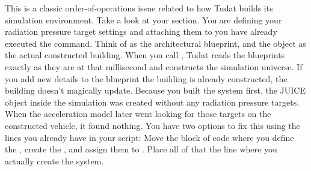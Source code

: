 {}This is a classic order-of-operations issue related to how Tudat builds its simulation environment.\markdownRendererInterblockSeparator
{}\markdownRendererSectionBegin
{}\markdownRendererInterblockSeparator
{}Take a look at your  section. You are defining your radiation pressure target settings and attaching them to   you have already executed the  command.\markdownRendererInterblockSeparator
{}
\markdownRendererSectionEnd \markdownRendererSectionBegin
{}\markdownRendererInterblockSeparator
{}Think of  as the architectural blueprint, and the  object as the actual constructed building.\markdownRendererInterblockSeparator
{}When you call , Tudat reads the blueprints exactly as they are at that millisecond and constructs the simulation universe. If you add new details to the blueprint  the building is already constructed, the building doesn't magically update.\markdownRendererInterblockSeparator
{}Because you built the system first, the JUICE object inside the simulation was created without any radiation pressure targets. When the acceleration model later went looking for those targets on the constructed vehicle, it found nothing.\markdownRendererInterblockSeparator
{}
\markdownRendererSectionEnd \markdownRendererSectionBegin
{}\markdownRendererInterblockSeparator
{}You have two options to fix this using the lines you already have in your script:\markdownRendererInterblockSeparator
{} Move the block of code where you define the , create the , and assign them to . Place all of that  the line where you actually create the  system.\markdownRendererInterblockSeparator
